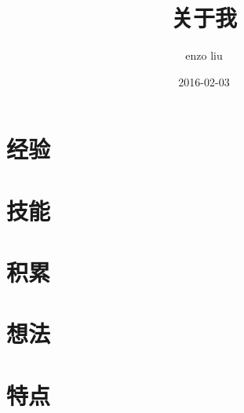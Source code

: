 \documentclass[11pt,a4paper]{article}
\author{enzo liu}
\date{2016-02-03}
\title{关于我}
\begin{document}
\maketitle

\section*{经验}
\label{sec:orgheadline1}

\section*{技能}
\label{sec:orgheadline2}

\section*{积累}
\label{sec:orgheadline3}

\section*{想法}
\label{sec:orgheadline4}

\section*{特点}
\label{sec:orgheadline5}
\end{document}
